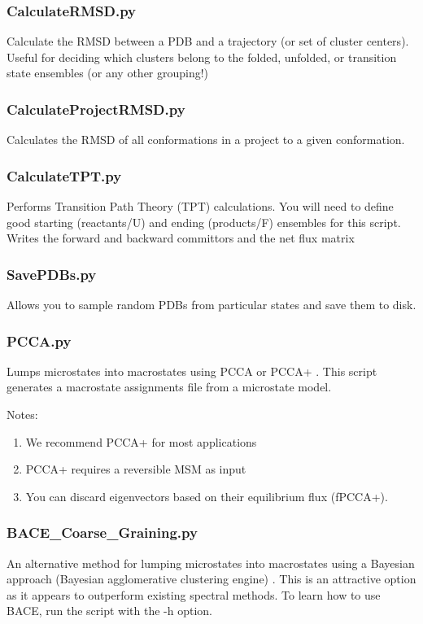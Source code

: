 \documentclass[12pt]{article}
\begin{document}
\subsubsection{CalculateRMSD.py}
Calculate the RMSD between a PDB and a trajectory (or set of cluster centers). Useful for deciding which clusters belong to the folded, unfolded, or transition state ensembles (or any other grouping!)

\subsubsection{CalculateProjectRMSD.py}
Calculates the RMSD of all conformations in a project to a given conformation.

\subsubsection{CalculateTPT.py}
Performs Transition Path Theory (TPT) calculations. You will need to define good starting (reactants/U) and ending (products/F) ensembles for this script. Writes the forward and backward committors and the net flux matrix

\subsubsection{SavePDBs.py}
Allows you to sample random PDBs from particular states and save them to disk.

\subsubsection{PCCA.py}
Lumps microstates into macrostates using PCCA \cite{Deuflhard2000} or PCCA+ \cite{Deuflhard2005, kube2007coarse}. This script generates a macrostate assignments file from a microstate model.  

Notes:
\begin{enumerate}
 \item We recommend PCCA+ for most applications
 \item PCCA+ requires a reversible MSM as input
 \item You can discard eigenvectors based on their equilibrium flux (fPCCA+).
\end{enumerate}

\subsubsection{BACE\_Coarse\_Graining.py}
An alternative method for lumping microstates into macrostates using a Bayesian approach (Bayesian agglomerative clustering engine) \cite{Bowman2012}.  This is an attractive option as it appears to outperform existing spectral methods.  To learn how to use BACE, run the script with the -h option.
\end{document}
